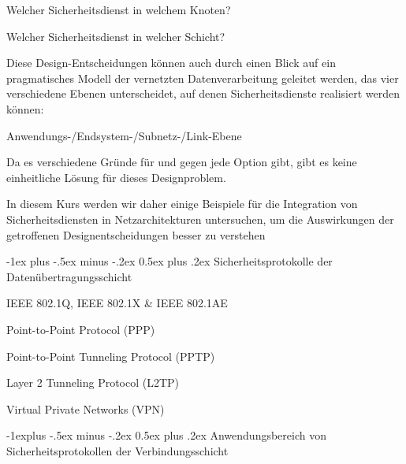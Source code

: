 \documentclass[a4paper]{article}
\makeatletter
\renewcommand{\section}{\@startsection{section}{1}{0mm}%
 {-1ex plus -.5ex minus -.2ex}%
 {0.5ex plus .2ex}%
 {\normalfont\large\bfseries}}
\renewcommand{\subsection}{\@startsection{subsection}{2}{0mm}%
 {-1explus -.5ex minus -.2ex}%
 {0.5ex plus .2ex}%
 {\normalfont\normalsize\bfseries}}
\makeatother
\begin{document}
\begin{multicols}{3}
\begin{itemize*}
            \begin{itemize*}
                  \item Welcher Sicherheitsdienst in welchem Knoten?
                  \item Welcher Sicherheitsdienst in welcher Schicht?
            \end{itemize*}
            \item
            Diese Design-Entscheidungen können auch durch einen Blick auf ein
            pragmatisches Modell der vernetzten Datenverarbeitung geleitet werden,
            das vier verschiedene Ebenen unterscheidet, auf denen
            Sicherheitsdienste realisiert werden können:

            \begin{itemize*}
                  \item Anwendungs-/Endsystem-/Subnetz-/Link-Ebene
            \end{itemize*}
            \item
            Da es verschiedene Gründe für und gegen jede Option gibt, gibt es
            keine einheitliche Lösung für dieses Designproblem.
            \item
            In diesem Kurs werden wir daher einige Beispiele für die Integration
            von Sicherheitsdiensten in Netzarchitekturen untersuchen, um die
            Auswirkungen der getroffenen Designentscheidungen besser zu verstehen
      \end{itemize*}


      \section{Sicherheitsprotokolle der
        Datenübertragungsschicht}

      \begin{itemize*}
            \item
            IEEE 802.1Q, IEEE 802.1X \& IEEE 802.1AE
            \item
            Point-to-Point Protocol (PPP)
            \item
            Point-to-Point Tunneling Protocol (PPTP)
            \item
            Layer 2 Tunneling Protocol (L2TP)
            \item
            Virtual Private Networks (VPN)
      \end{itemize*}


      \subsection{Anwendungsbereich von Sicherheitsprotokollen der
            Verbindungsschicht}


\end{multicols}
\end{document}
